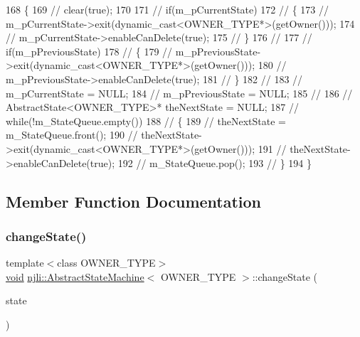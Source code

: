 \begin{DoxyCode}
168   \{
169     \textcolor{comment}{//        clear(true);}
170 
171     \textcolor{comment}{//        if(m\_pCurrentState)}
172     \textcolor{comment}{//        \{}
173     \textcolor{comment}{//            m\_pCurrentState->exit(dynamic\_cast<OWNER\_TYPE*>(getOwner()));}
174     \textcolor{comment}{//            m\_pCurrentState->enableCanDelete(true);}
175     \textcolor{comment}{//        \}}
176     \textcolor{comment}{//}
177     \textcolor{comment}{//        if(m\_pPreviousState)}
178     \textcolor{comment}{//        \{}
179     \textcolor{comment}{//            m\_pPreviousState->exit(dynamic\_cast<OWNER\_TYPE*>(getOwner()));}
180     \textcolor{comment}{//            m\_pPreviousState->enableCanDelete(true);}
181     \textcolor{comment}{//        \}}
182     \textcolor{comment}{//}
183     \textcolor{comment}{//        m\_pCurrentState = NULL;}
184     \textcolor{comment}{//        m\_pPreviousState = NULL;}
185     \textcolor{comment}{//}
186     \textcolor{comment}{//        AbstractState<OWNER\_TYPE>* theNextState = NULL;}
187     \textcolor{comment}{//        while(!m\_StateQueue.empty())}
188     \textcolor{comment}{//        \{}
189     \textcolor{comment}{//            theNextState = m\_StateQueue.front();}
190     \textcolor{comment}{//            theNextState->exit(dynamic\_cast<OWNER\_TYPE*>(getOwner()));}
191     \textcolor{comment}{//            theNextState->enableCanDelete(true);}
192     \textcolor{comment}{//            m\_StateQueue.pop();}
193     \textcolor{comment}{//        \}}
194   \}
\end{DoxyCode}


\subsection{Member Function Documentation}
\mbox{\label{classnjli_1_1_abstract_state_machine_a5133f8815d99e63c09179928e2c736b6}} 
\subsubsection{\texorpdfstring{change\+State()}{changeState()}}
{\footnotesize\ttfamily template$<$class O\+W\+N\+E\+R\+\_\+\+T\+Y\+PE$>$ \\
\mbox{\hyperlink{_thread_8h_af1e856da2e658414cb2456cb6f7ebc66}{void}} \mbox{\hyperlink{classnjli_1_1_abstract_state_machine}{njli\+::\+Abstract\+State\+Machine}}$<$ O\+W\+N\+E\+R\+\_\+\+T\+Y\+PE $>$\+::change\+State (\begin{DoxyParamCaption}\item[{\mbox{\hyperlink{classnjli_1_1_abstract_state}{Abstract\+State}}$<$ O\+W\+N\+E\+R\+\_\+\+T\+Y\+PE $>$ $\ast$}]{state }\end{DoxyParamCaption})\hspace{0.3cm}{\ttfamily [private]}}



